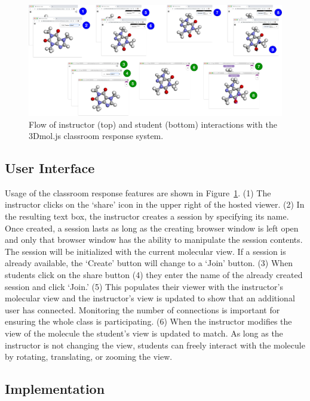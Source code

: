 \documentclass[journal=jceda8,manuscript=article]{achemso}
\begin{document}
\begin{figure}
    \centering
    \includegraphics[width=\linewidth]{flow}
    \caption{Flow of instructor (top) and student (bottom) interactions with the 3Dmol.js classroom response system.}
    \label{fig:flow}
\end{figure}

\subsection{User Interface}

Usage of the classroom response features are shown in Figure~\ref{fig:flow}.  (1) The instructor clicks on the `share' icon in the upper right of the hosted viewer. (2) In the resulting text box, the instructor creates a session by specifying its name.  Once created, a session lasts as long as the creating browser window is left open and only that browser window has the ability to manipulate the session contents.  The session will be initialized with the current molecular view. If a session is already available, the `Create' button will change to a `Join' button.  (3) When students click on the share button (4) they enter the name of the already created session and click `Join.'  (5) This populates their viewer with the instructor's molecular view and the instructor's view is updated to show that an additional user has connected.  Monitoring the number of connections is important for ensuring the whole class is participating.  (6) When the instructor modifies the view of the molecule the student's view is updated to match.  As long as the instructor is not changing the view, students can freely interact with the molecule by rotating, translating, or zooming the view.


\subsection{Implementation}
\end{document}
